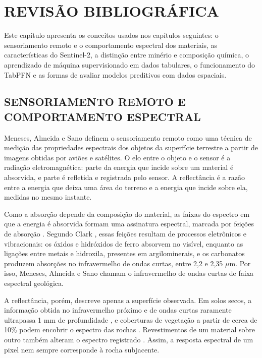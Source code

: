 \chapter{REVISÃO BIBLIOGRÁFICA}
\label{chap:revisao-bibliografica}

Este capítulo apresenta os conceitos usados nos capítulos seguintes: o sensoriamento remoto e o comportamento espectral dos materiais, as características do Sentinel-2, a distinção entre minério e composição química, o aprendizado de máquina supervisionado em dados tabulares, o funcionamento do TabPFN e as formas de avaliar modelos preditivos com dados espaciais.

\section{SENSORIAMENTO REMOTO E COMPORTAMENTO ESPECTRAL}

Meneses, Almeida e Sano \cite{meneses2025} definem o sensoriamento remoto como uma técnica de medição das propriedades espectrais dos objetos da superfície terrestre a partir de imagens obtidas por aviões e satélites. O elo entre o objeto e o sensor é a radiação eletromagnética: parte da energia que incide sobre um material é absorvida, e parte é refletida e registrada pelo sensor. A reflectância é a razão entre a energia que deixa uma área do terreno e a energia que incide sobre ela, medidas no mesmo instante.

Como a absorção depende da composição do material, as faixas do espectro em que a energia é absorvida formam uma assinatura espectral, marcada por feições de absorção \cite{meneses2025}. Segundo Clark \cite{clark1999}, essas feições resultam de processos eletrônicos e vibracionais: os óxidos e hidróxidos de ferro absorvem no visível, enquanto as ligações entre metais e hidroxila, presentes em argilominerais, e os carbonatos produzem absorções no infravermelho de ondas curtas, entre 2,2 e 2,35 $\mu$m. Por isso, Meneses, Almeida e Sano \cite{meneses2025} chamam o infravermelho de ondas curtas de faixa espectral geológica.

A reflectância, porém, descreve apenas a superfície observada. Em solos secos, a informação obtida no infravermelho próximo e de ondas curtas raramente ultrapassa 1 mm de profundidade \cite{norouzi2021}, e coberturas de vegetação a partir de cerca de 10\% podem encobrir o espectro das rochas \cite{grebby2011}. Revestimentos de um material sobre outro também alteram o espectro registrado \cite{clark1999}. Assim, a resposta espectral de um pixel nem sempre corresponde à rocha subjacente.

